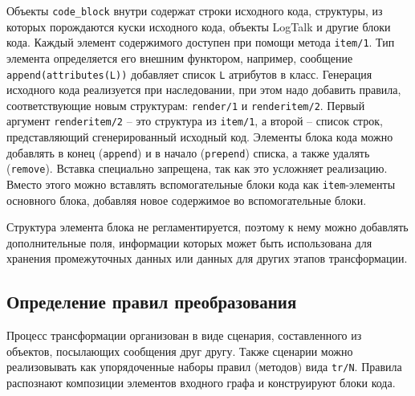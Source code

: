 \documentclass[conference]{IEEEtran} \IEEEoverridecommandlockouts
\begin{document}
Объекты \verb|code_block| внутри содержат строки исходного кода, структуры, из которых порождаются куски исходного кода, объекты LogTalk и другие блоки кода. Каждый элемент содержимого доступен при помощи метода \verb|item/1|. Тип элемента определяется его внешним функтором, например, сообщение \verb|append(attributes(L))| добавляет список \verb|L| атрибутов в класс. Генерация исходного кода реализуется при наследовании, при этом надо добавить правила, соответствующие новым структурам: \verb|render/1| и \verb|renderitem/2|. Первый аргумент \verb|renderitem/2| -- это структура из \verb|item/1|, а второй -- список строк, представляющий сгенерированный исходный код. Элементы блока кода можно добавлять в конец (\verb|append|) и в начало (\verb|prepend|) списка, а также удалять (\verb|remove|). Вставка специально запрещена, так как это усложняет реализацию. Вместо этого можно вставлять вспомогательные блоки кода как \verb|item|-элементы основного блока, добавляя новое содержимое во вспомогательные блоки.

Структура элемента блока не регламентируется, поэтому к нему можно добавлять дополнительные поля, информации которых может быть использована для хранения промежуточных данных или данных для других этапов трансформации.

\subsection{Определение правил преобразования} \label{sec:mda-rules}

Процесс трансформации организован в виде сценария, составленного из объектов, посылающих сообщения друг другу. Также сценарии можно реализовывать как упорядоченные наборы правил (методов) вида \verb|tr/N|. Правила распознают композиции элементов входного графа и конструируют блоки кода.
\end{document}
